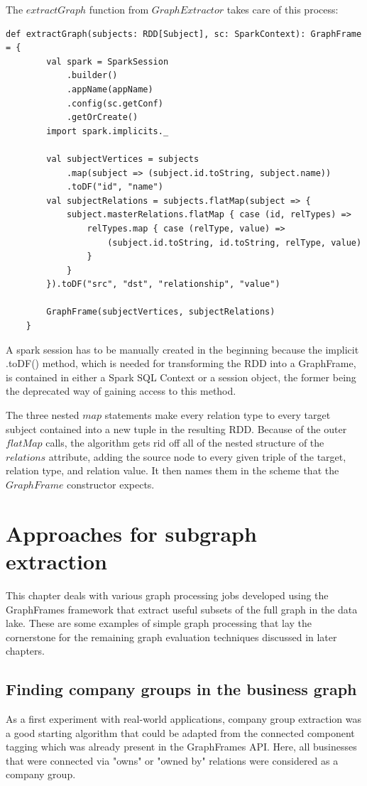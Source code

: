 \documentclass[
        a4paper,     %
        titlepage,   %
        oneside,     %
        parskip      %
        ]{scrartcl}  %
\begin{document}
    The $extractGraph$ function from $GraphExtractor$ takes care of this process:

    \begin{lstlisting}[style=scalaStyle,caption=extractGraph in $GraphExtractor$]
    def extractGraph(subjects: RDD[Subject], sc: SparkContext): GraphFrame = {
  		val spark = SparkSession
  			.builder()
  			.appName(appName)
  			.config(sc.getConf)
  			.getOrCreate()
  		import spark.implicits._

  		val subjectVertices = subjects
  			.map(subject => (subject.id.toString, subject.name))
  			.toDF("id", "name")
  		val subjectRelations = subjects.flatMap(subject => {
  			subject.masterRelations.flatMap { case (id, relTypes) =>
  				relTypes.map { case (relType, value) =>
  					(subject.id.toString, id.toString, relType, value)
  				}
  			}
  		}).toDF("src", "dst", "relationship", "value")

  		GraphFrame(subjectVertices, subjectRelations)
  	}
    \end{lstlisting}

    A spark session has to be manually created in the beginning because the implicit .toDF() method,
    which is needed for transforming the RDD into a GraphFrame, is contained in either a
    Spark SQL Context or a session object, the former being the deprecated way of gaining access to this method.

    The three nested $map$ statements make every relation type to every target subject
    contained into a new tuple in the resulting RDD. Because of the outer $flatMap$
    calls, the algorithm gets rid off all of the nested structure of the $relations$
    attribute, adding the source node to every given triple of the target, relation type, and relation value.
    It then names them in the scheme that the $GraphFrame$ constructor expects.
    \pagebreak

  \section{Approaches for subgraph extraction}
  This chapter deals with various graph processing jobs developed using the
  GraphFrames framework that extract useful subsets of the full graph in the data lake.
  These are some examples of simple graph processing that lay the cornerstone
  for the remaining graph evaluation techniques discussed in later chapters.

  \subsection{Finding company groups in the business graph}
  As a first experiment with real-world applications, company group extraction
  was a good starting algorithm that could be adapted from the connected component
  tagging which was already present in the GraphFrames API.
  Here, all businesses that were connected via "owns" or "owned by"
  relations were considered as a company group.
\end{document}
